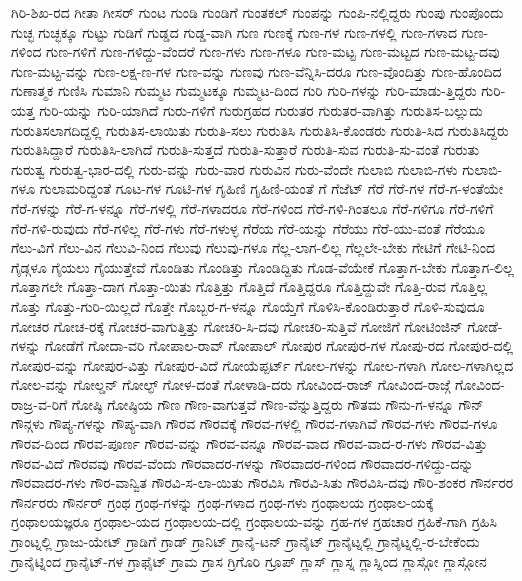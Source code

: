 {ಗಿರಿ-ಶಿಖ-ರದ
ಗೀತಾ
ಗೀಸರ್
ಗುಂಟ
ಗುಂಡಿ
ಗುಂಡಿಗೆ
ಗುಂತಕಲ್
ಗುಂಪನ್ನು
ಗುಂಪಿ-ನಲ್ಲಿದ್ದರು
ಗುಂಪು
ಗುಂಪೊಂದು
ಗುಚ್ಛ
ಗುಚ್ಛಕ್ಕೂ
ಗುಟ್ಟು
ಗುಡಿಗೆ
ಗುಡ್ಡದ
ಗುಡ್ಡ-ವಾಗಿ
ಗುಣ
ಗುಣಕ್ಕೆ
ಗುಣ-ಗಳ
ಗುಣ-ಗಳಲ್ಲಿ
ಗುಣ-ಗಳಾದ
ಗುಣ-ಗಳಿಂದ
ಗುಣ-ಗಳಿಗೆ
ಗುಣ-ಗಳಿದ್ದು-ವೆಂದರೆ
ಗುಣ-ಗಳು
ಗುಣ-ಗಳೂ
ಗುಣ-ಮಟ್ಟ
ಗುಣ-ಮಟ್ಟದ
ಗುಣ-ಮಟ್ಟ-ದವು
ಗುಣ-ಮಟ್ಟ-ವನ್ನು
ಗುಣ-ಲಕ್ಷ-ಣ-ಗಳ
ಗುಣ-ವನ್ನು
ಗುಣವು
ಗುಣ-ವೆನ್ನಿಸಿ-ದರೂ
ಗುಣ-ವೊಂದಿತ್ತು
ಗುಣ-ಹೊಂದಿದ
ಗುಣಾತ್ಮಕ
ಗುಣಿಸಿ
ಗುಮಾನಿ
ಗುಮ್ಮಟ
ಗುಮ್ಮಟಕ್ಕೂ
ಗುಮ್ಮಟ-ದಿಂದ
ಗುರಿ
ಗುರಿ-ಗಳನ್ನು
ಗುರಿ-ಮಾಡು-ತ್ತಿದ್ದರು
ಗುರಿ-ಯತ್ತ
ಗುರಿ-ಯನ್ನು
ಗುರಿ-ಯಾಗಿದೆ
ಗುರು-ಗಳಿಗೆ
ಗುರುಗ್ರಹದ
ಗುರುತರ
ಗುರುತರ-ವಾಗಿತ್ತು
ಗುರುತಿಸ-ಬಲ್ಲುದು
ಗುರುತಿಸಲಾಗದಿದ್ದಲ್ಲಿ
ಗುರುತಿಸ-ಲಾಯಿತು
ಗುರುತಿ-ಸಲು
ಗುರುತಿಸಿ
ಗುರುತಿಸಿ-ಕೊಂಡರು
ಗುರುತಿ-ಸಿದ
ಗುರುತಿಸಿದ್ದರು
ಗುರುತಿಸಿದ್ದಾರೆ
ಗುರುತಿಸಿ-ಲಾಗಿದೆ
ಗುರುತಿ-ಸುತ್ತದೆ
ಗುರುತಿ-ಸುತ್ತಾರೆ
ಗುರುತಿ-ಸುವ
ಗುರುತಿ-ಸು-ವಂತೆ
ಗುರುತು
ಗುರುತ್ವ
ಗುರುತ್ವ-ಭಾರ-ದಲ್ಲಿ
ಗುರು-ವನ್ನು
ಗುರು-ವಾರ
ಗುರುವಿನ
ಗುರು-ವೆಂದೇ
ಗುಲಾಬಿ
ಗುಲಾಬಿ-ಗಳು
ಗುಲಾಬಿ-ಗಳೂ
ಗುಲಾಮರಿದ್ದಂತೆ
ಗೂಟ-ಗಳ
ಗೂಟಿ-ಗಳ
ಗೃಹಿಣಿ
ಗೃಹಿಣಿ-ಯಂತೆ
ಗೆ
ಗೆಜೆಟ್
ಗೆರೆ
ಗೆರೆ-ಗಳ
ಗೆರೆ-ಗ-ಳಂತೆಯೇ
ಗೆರೆ-ಗಳನ್ನು
ಗೆರೆ-ಗ-ಳನ್ನೂ
ಗೆರೆ-ಗಳಲ್ಲಿ
ಗೆರೆ-ಗಳಾದರೂ
ಗೆರೆ-ಗಳಿಂದ
ಗೆರೆ-ಗಳಿ-ಗಿಂತಲೂ
ಗೆರೆ-ಗಳಿಗೂ
ಗೆರೆ-ಗಳಿಗೆ
ಗೆರೆ-ಗಳಿ-ರುವುದು
ಗೆರೆ-ಗಳಿಲ್ಲ
ಗೆರೆ-ಗಳು
ಗೆರೆ-ಗಳುಳ್ಳ
ಗೆರೆಯ
ಗೆರೆ-ಯನ್ನು
ಗೆರೆಯು
ಗೆರೆ-ಯು-ವಂತೆ
ಗೆರೆಯೂ
ಗೆಲು-ವಿಗೆ
ಗೆಲು-ವಿನ
ಗೆಲುವಿ-ನಿಂದ
ಗೆಲುವು
ಗೆಲುವು-ಗಳೂ
ಗೆಲ್ಲ-ಲಾಗ-ಲಿಲ್ಲ
ಗೆಲ್ಲಲೇ-ಬೇಕು
ಗೇಟಿಗೆ
ಗೇಟಿ-ನಿಂದ
ಗೈಡ್ಗಳೂ
ಗೈಯಲು
ಗೈಯುತ್ತೇವೆ
ಗೊಂಡಿತು
ಗೊಂಡಿತ್ತು
ಗೊಂಡಿದ್ದಿತು
ಗೊಡ-ವೆಯೇಕೆ
ಗೊತ್ತಾಗ-ಬೇಕು
ಗೊತ್ತಾಗ-ಲಿಲ್ಲ
ಗೊತ್ತಾಗಲೇ
ಗೊತ್ತಾ-ದಾಗ
ಗೊತ್ತಾ-ಯಿತು
ಗೊತ್ತಿತ್ತು
ಗೊತ್ತಿದೆ
ಗೊತ್ತಿದ್ದರೂ
ಗೊತ್ತಿದ್ದುವೇ
ಗೊತ್ತಿ-ರುವ
ಗೊತ್ತಿಲ್ಲ
ಗೊತ್ತು
ಗೊತ್ತು-ಗುರಿ-ಯಿಲ್ಲದೆ
ಗೊತ್ತೇ
ಗೊಬ್ಬರ-ಗ-ಳನ್ನೂ
ಗೊಯ್ತೆಗೆ
ಗೊಳಿಸಿ-ಕೊಂಡಿರುತ್ತಾರೆ
ಗೊಳಿ-ಸುವುದೂ
ಗೋಚರ
ಗೋಚ-ರಕ್ಕೆ
ಗೋಚರ-ವಾಗುತ್ತಿತ್ತು
ಗೋಚರಿ-ಸಿ-ದವು
ಗೋಚರಿ-ಸುತ್ತಿವೆ
ಗೋಜಿಗೆ
ಗೋಟಿಂಜಿನ್
ಗೋಡೆ-ಗಳನ್ನು
ಗೋಡೆಗೆ
ಗೋದಾ-ವರಿ
ಗೋಪಾಲ-ರಾವ್
ಗೋಪಾಲ್
ಗೋಪುರ
ಗೋಪುರ-ಗಳ
ಗೋಪು-ರದ
ಗೋಪುರ-ದಲ್ಲಿ
ಗೋಪುರ-ವನ್ನು
ಗೋಪುರ-ವಿತ್ತು
ಗೋಪುರ-ವಿದೆ
ಗೋಯೆಪ್ಪರ್ಟ್
ಗೋಲ-ಗಳನ್ನು
ಗೋಲ-ಗಳಾಗಿ
ಗೋಲ-ಗಳಾಗಿಲ್ಲದ
ಗೋಲ-ವನ್ನು
ಗೋಲ್ಡನ್
ಗೋಲ್ಫ್
ಗೋಳ-ದಂತೆ
ಗೋಳಾಡಿ-ದರು
ಗೋವಿಂದ-ರಾಜ್
ಗೋವಿಂದ-ರಾಜ್ಗೆ
ಗೋವಿಂದ-ರಾಜ್ರ-ವ-ರಿಗೆ
ಗೋಷ್ಠಿ
ಗೋಷ್ಠಿಯ
ಗೌಣ
ಗೌಣ-ವಾಗುತ್ತವೆ
ಗೌಣ-ವೆನ್ನುತ್ತಿದ್ದರು
ಗೌತಮ
ಗೌನು-ಗ-ಳನ್ನೂ
ಗೌನ್
ಗೌನ್ಗಳು
ಗೌಪ್ಯ-ಗಳನ್ನು
ಗೌಪ್ಯ-ವಾಗಿ
ಗೌರವ
ಗೌರವಕ್ಕೆ
ಗೌರವ-ಗಳಲ್ಲಿ
ಗೌರವ-ಗಳಾಗಿವೆ
ಗೌರವ-ಗಳು
ಗೌರವ-ಗಳೂ
ಗೌರವ-ದಿಂದ
ಗೌರವ-ಪೂರ್ಣ
ಗೌರವ-ವನ್ನು
ಗೌರವ-ವನ್ನೂ
ಗೌರವ-ವಾದ
ಗೌರವ-ವಾದ-ರ-ಗಳು
ಗೌರವ-ವಿತ್ತು
ಗೌರವ-ವಿದೆ
ಗೌರವವು
ಗೌರವ-ವೆಂದು
ಗೌರವಾದರ-ಗಳನ್ನು
ಗೌರವಾದರ-ಗಳಿಂದ
ಗೌರವಾದರ-ಗಳಿದ್ದು-ದನ್ನು
ಗೌರವಾದರ-ಗಳು
ಗೌರ-ವಾನ್ವಿತ
ಗೌರವಿ-ಸ-ಲಾ-ಯಿತು
ಗೌರವಿಸಿ
ಗೌರವಿ-ಸಿತು
ಗೌರವಿಸಿ-ದವು
ಗೌರಿ-ಶಂಕರ
ಗೌರ್ನರರ
ಗೌರ್ನರರು
ಗೌರ್ನರ್
ಗ್ರಂಥ
ಗ್ರಂಥ-ಗಳನ್ನು
ಗ್ರಂಥ-ಗಳಾದ
ಗ್ರಂಥ-ಗಳು
ಗ್ರಂಥಾಲಯ
ಗ್ರಂಥಾಲ-ಯಕ್ಕೆ
ಗ್ರಂಥಾಲಯಜ್ಞರೂ
ಗ್ರಂಥಾಲ-ಯದ
ಗ್ರಂಥಾಲಯ-ದಲ್ಲಿ
ಗ್ರಂಥಾಲಯ-ವನ್ನು
ಗ್ರಹ-ಗಳ
ಗ್ರಹಚಾರ
ಗ್ರಹಿಕೆ-ಗಾಗಿ
ಗ್ರಹಿಸಿ
ಗ್ರಾಂಟ್ನಲ್ಲಿ
ಗ್ರಾಜು-ಯೇಟ್
ಗ್ರಾಡಿಗೆ
ಗ್ರಾಡ್
ಗ್ರಾನಿಟ್
ಗ್ರಾನೈ-ಟನ್
ಗ್ರಾನೈಟ್
ಗ್ರಾನೈಟ್ನಲ್ಲಿ
ಗ್ರಾನೈಟ್ನಲ್ಲಿ-ರ-ಬೇಕೆಂದು
ಗ್ರಾನೈಟ್ನಿಂದ
ಗ್ರಾನೈಟ್-ಗಳ
ಗ್ರಾಫೈಟ್
ಗ್ರಾಮ
ಗ್ರಾಸ
ಗ್ರಿಗೊರಿ
ಗ್ರೂಪ್
ಗ್ಲಾಸ್
ಗ್ಲಾಸ್ನ
ಗ್ಲಾಸ್ನಿಂದ
ಗ್ಲಾಸ್ಗೋ
ಗ್ಲಾಸ್ಗೋನ
}
